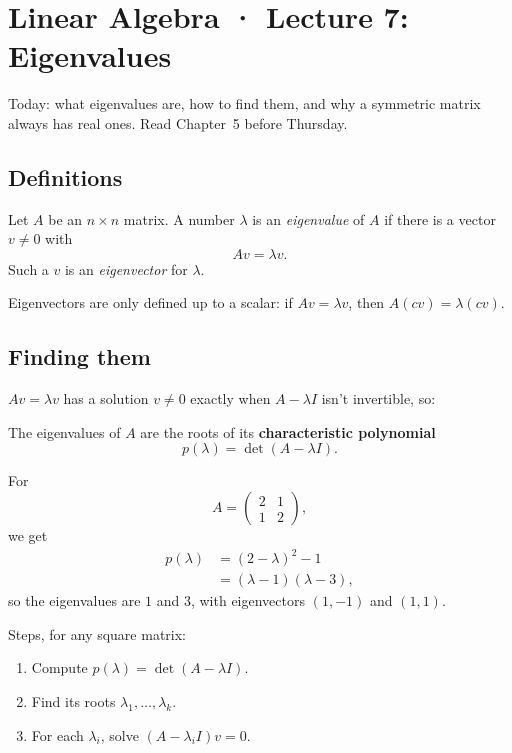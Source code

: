 \section{Linear Algebra · Lecture 7: Eigenvalues}

Today: what eigenvalues are, how to find them, and why a symmetric matrix always has real ones. Read Chapter~5 before Thursday.

\subsection{Definitions}

\begin{definition}
Let $A$ be an $n \times n$ matrix. A number $\lambda$ is an \emph{eigenvalue} of $A$ if there is a vector $v \neq 0$ with
\[ A v = \lambda v. \]
Such a $v$ is an \emph{eigenvector} for $\lambda$.
\end{definition}

\begin{remark}
Eigenvectors are only defined up to a scalar: if $Av = \lambda v$, then $A(cv) = \lambda (cv)$.
\end{remark}

\subsection{Finding them}

$Av = \lambda v$ has a solution $v \neq 0$ exactly when $A - \lambda I$ isn't invertible, so:

\begin{theorem}
The eigenvalues of $A$ are the roots of its \textbf{characteristic polynomial}
\[ p(\lambda) = \det(A - \lambda I). \]
\end{theorem}

\begin{example}
For
\[ A = \begin{pmatrix} 2 & 1 \\ 1 & 2 \end{pmatrix}, \]
we get
\begin{align*}
  p(\lambda) &= (2 - \lambda)^2 - 1 \\
             &= (\lambda - 1)(\lambda - 3),
\end{align*}
so the eigenvalues are $1$ and $3$, with eigenvectors $(1, -1)$ and $(1, 1)$.
\end{example}

Steps, for any square matrix:
\begin{enumerate}
  \item Compute $p(\lambda) = \det(A - \lambda I)$.
  \item Find its roots $\lambda_1, \ldots, \lambda_k$.
  \item For each $\lambda_i$, solve $(A - \lambda_i I) v = 0$.
\end{enumerate}

